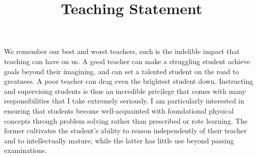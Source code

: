 \documentclass[11pt,letterpaper,sans]{moderncv} %
\title{\huge{Teaching Statement}}
\begin{document}
\makecvtitle %

\vspace{-3mm}

We remember our best and worst teachers, such is the indelible impact that teaching can have on us. A good teacher can make a struggling student achieve goals beyond their imagining, and can set a talented student on the road to greatness. A poor teacher can drag even the brightest student down. Instructing and supervising students is thus an incredible privilege that comes with many responsibilities that I take extremely seriously. %
I am particularly interested in ensuring that students become well-acquainted with foundational physical concepts through problem solving rather than prescribed or rote learning. The former cultivates the student's ability to reason independently of their teacher and to intellectually mature, while the latter has little use beyond passing examinations. 
\vspace{2mm}

\end{document}
